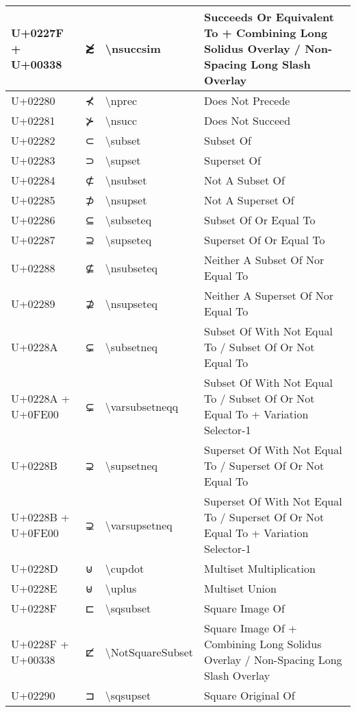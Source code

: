\begin{table}[h]
\begin{tabulary}{\linewidth}{|L|L|L|L|}
\hline
U+0227F + U+00338 & ≿̸ & {\textbackslash}nsuccsim & Succeeds Or Equivalent To + Combining Long Solidus Overlay / Non-Spacing Long Slash Overlay \\
\hline
U+02280 & ⊀ & {\textbackslash}nprec & Does Not Precede \\
\hline
U+02281 & ⊁ & {\textbackslash}nsucc & Does Not Succeed \\
\hline
U+02282 & ⊂ & {\textbackslash}subset & Subset Of \\
\hline
U+02283 & ⊃ & {\textbackslash}supset & Superset Of \\
\hline
U+02284 & ⊄ & {\textbackslash}nsubset & Not A Subset Of \\
\hline
U+02285 & ⊅ & {\textbackslash}nsupset & Not A Superset Of \\
\hline
U+02286 & ⊆ & {\textbackslash}subseteq & Subset Of Or Equal To \\
\hline
U+02287 & ⊇ & {\textbackslash}supseteq & Superset Of Or Equal To \\
\hline
U+02288 & ⊈ & {\textbackslash}nsubseteq & Neither A Subset Of Nor Equal To \\
\hline
U+02289 & ⊉ & {\textbackslash}nsupseteq & Neither A Superset Of Nor Equal To \\
\hline
U+0228A & ⊊ & {\textbackslash}subsetneq & Subset Of With Not Equal To / Subset Of Or Not Equal To \\
\hline
U+0228A + U+0FE00 & ⊊︀ & {\textbackslash}varsubsetneqq & Subset Of With Not Equal To / Subset Of Or Not Equal To + Variation Selector-1 \\
\hline
U+0228B & ⊋ & {\textbackslash}supsetneq & Superset Of With Not Equal To / Superset Of Or Not Equal To \\
\hline
U+0228B + U+0FE00 & ⊋︀ & {\textbackslash}varsupsetneq & Superset Of With Not Equal To / Superset Of Or Not Equal To + Variation Selector-1 \\
\hline
U+0228D & ⊍ & {\textbackslash}cupdot & Multiset Multiplication \\
\hline
U+0228E & ⊎ & {\textbackslash}uplus & Multiset Union \\
\hline
U+0228F & ⊏ & {\textbackslash}sqsubset & Square Image Of \\
\hline
U+0228F + U+00338 & ⊏̸ & {\textbackslash}NotSquareSubset & Square Image Of + Combining Long Solidus Overlay / Non-Spacing Long Slash Overlay \\
\hline
U+02290 & ⊐ & {\textbackslash}sqsupset & Square Original Of \\
\hline

\end{tabulary}
\end{table}
